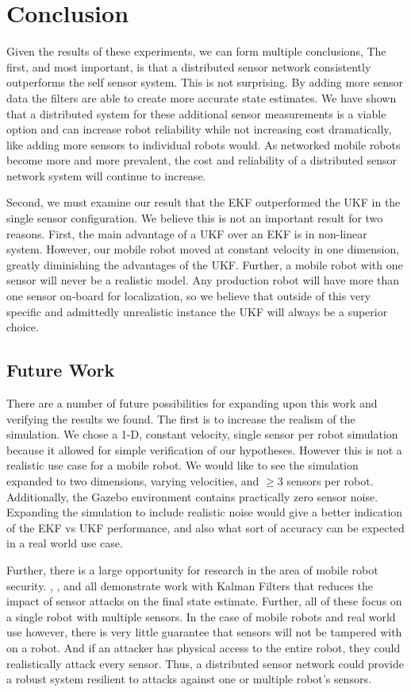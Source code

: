 \documentclass[conference]{IEEEtran} \usepackage[T1]{fontenc} \usepackage[backend=biber, style=ieee]{biblatex}
\begin{document}
\section{Conclusion} \label{Conclusion} 
Given the results of these experiments, we can form multiple conclusions, The first, and most important, is that a distributed sensor network consistently outperforms the self sensor system. This is not surprising. By adding more sensor data the filters are able to create more accurate state estimates. We have shown that a distributed system for these additional sensor measurements is a viable option and can increase robot reliability while not increasing cost dramatically, like adding more sensors to individual robots would. As networked mobile robots become more and more prevalent, the cost and reliability of a distributed sensor network system will continue to increase.

Second, we must examine our result that the EKF outperformed the UKF in the single sensor configuration. We believe this is not an important result for two reasons. First, the main advantage of a UKF over an EKF is in non-linear system. However, our mobile robot moved at constant velocity in one dimension, greatly diminishing the advantages of the UKF. Further, a mobile robot with one sensor will never be a realistic model. Any production robot will have more than one sensor on-board for localization, so we believe that outside of this very specific and admittedly unrealistic instance the UKF will always be a superior choice.

\subsection{Future Work}
There are a number of future possibilities for expanding upon this work and verifying the results we found. The first is to increase the realism of the simulation. We chose a 1-D, constant velocity, single sensor per robot simulation because it allowed for simple verification of our hypotheses. However this is not a realistic use case for a mobile robot. We would like to see the simulation expanded to two dimensions, varying velocities, and $\geq 3$ sensors per robot. Additionally, the Gazebo environment contains practically zero sensor noise. Expanding the simulation to include realistic noise would give a better indication of the EKF vs UKF performance, and also what sort of accuracy can be expected in a real world use case.

Further, there is a large opportunity for research in the area of mobile robot security. \cite{bezzo2014attack}, \cite{fawzi2011secure}, and \cite{mo2014resilient} all demonstrate work with Kalman Filters that reduces the impact of sensor attacks on the final state estimate. Further, all of these focus on a single robot with multiple sensors. In the case of mobile robots and real world use however, there is very little guarantee that sensors will not be tampered with on a robot. And if an attacker has physical access to the entire robot, they could realistically attack every sensor. Thus, a distributed sensor network could provide a robust system resilient to attacks against one or multiple robot's sensors. 

\printbibliography
\end{document}
